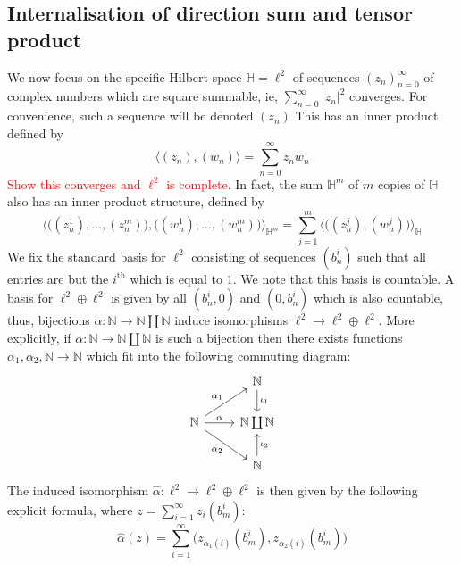\documentclass[12pt]{article}
\theoremstyle{plain}
\theoremstyle{definition}
\newcommand{\bb}[1]{\mathbb{#1}}
\newcommand{\lto}{\longrightarrow}
\begin{document}
\subsection{Internalisation of direction sum and tensor product}\label{sec:interal_sum_tens}
We now focus on the specific Hilbert space $\bb{H} = \ell^2$ of sequences $(z_n)_{n = 0}^\infty$ of complex numbers which are square summable, ie, $\sum_{n = 0}^\infty |z_n|^2$ converges. For convenience, such a sequence will be denoted $(z_n)$ This has an inner product defined by
\begin{equation}
    \big\langle (z_n), (w_n)\big\rangle = \sum_{n = 0}^\infty z_n\overline{w}_n
\end{equation}
\textcolor{red}{Show this converges and $\ell^2$ is complete}.
In fact, the sum $\bb{H}^m$ of $m$ copies of $\bb{H}$ also has an inner product structure, defined by
\begin{equation}\label{eq:bijection}
    \Big\langle \big((z_n^1),...,(z_n^m)\big),\big((w_n^1),...,(w_n^m)\big)\Big\rangle_{\bb{H}^m} = \sum_{j = 1}^m\Big\langle \big((z_n^j),(w_n^j)\big)\Big\rangle_{\bb{H}}
\end{equation}
We fix the standard basis for $\ell^2$ consisting of sequences $(b^i_n)$ such that all entries are but the $i^{\operatorname{th}}$ which is equal to $1$. We note that this basis is countable. A basis for $\ell^2 \oplus \ell^2$ is given by all $(b^i_n, 0)$ and $(0,b_n^i)$ which is also countable, thus, bijections $\alpha: \bb{N} \lto \bb{N} \coprod \bb{N}$ induce isomorphisms $\ell^2 \lto \ell^2 \oplus \ell^2$. More explicitly, if $\alpha: \bb{N} \lto \bb{N} \coprod \bb{N}$ is such a bijection then there exists functions $\alpha_1,\alpha_2, \bb{N} \lto \bb{N}$ which fit into the following commuting diagram:
\begin{equation}
\begin{tikzcd}
& \bb{N}\arrow[d,"{\iota_1}"]\\
\bb{N}\arrow[ur,"{\alpha_1}"]\arrow[dr,swap,"{\alpha_2}"]\arrow[r,"{\alpha}"] & \bb{N} \coprod \bb{N}\\
& \bb{N}\arrow[u,swap,"{\iota_2}"]
\end{tikzcd}
\end{equation}
The induced isomorphism $\hat{\alpha}: \ell^2 \lto \ell^2 \oplus \ell^2$ is then given by the following explicit formula, where $z = \sum_{i = 1}^\infty z_i(b^i_m)$:
\begin{equation}\label{eq:alpha_hat}
    \hat{\alpha}(z) = \sum_{i = 1}^\infty\Big( z_{\alpha_1(i)}(b^i_m),z_{\alpha_2(i)}(b^i_m)\Big)
\end{equation}
\end{document}
